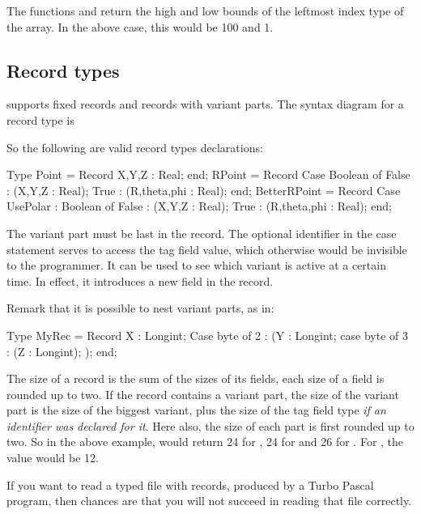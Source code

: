 \documentclass{report}
\begin{document}
The functions  and  return the high and low bounds of
the leftmost index type of the array. In the above case, this would be 100 
and 1.

\subsection{Record types}

\fpc supports fixed records and records with variant parts. 
The syntax diagram for a record type is



So the following are valid record types declarations:
\begin{listing}
Type
  Point = Record
          X,Y,Z : Real;
          end;
  RPoint = Record
          Case Boolean of
          False : (X,Y,Z : Real);
          True : (R,theta,phi : Real);
          end;
  BetterRPoint = Record
          Case UsePolar : Boolean of
          False : (X,Y,Z : Real);
          True : (R,theta,phi : Real);
          end;
\end{listing}

The variant part must be last in the record. The optional identifier in the
case statement serves to access the tag field value, which otherwise would
be invisible to the programmer. It can be used to see which variant is 
active at a certain time. In effect, it introduces a new field in the
record.

Remark that it is possible to  nest variant parts, as in:
\begin{listing}
Type
  MyRec = Record
          X : Longint;
          Case byte of
            2 : (Y : Longint;
                 case byte of
                 3 : (Z : Longint);
                 );
          end;     
\end{listing}

The size of a record is the sum of the sizes of its fields, each size of a
field is rounded up to two. If the record contains a variant part, the size
of the variant part is the size of the biggest variant, plus the size of the
tag field type {\em if an identifier was declared for it}. Here also, the size of 
each part is first rounded up to two. So in the above example, 
 would return 24 for , 24 for  and 
26 for . For , the value would be 12.

If you want to read a typed file with records, produced by
a Turbo Pascal program, then chances are that you will not succeed in
reading that file correctly.
\end{document}
